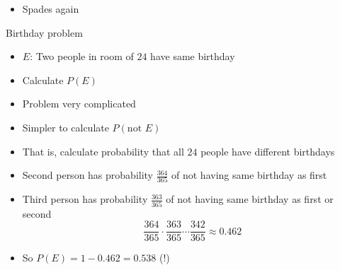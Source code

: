 \documentclass[handout]{beamer}
\theoremstyle{definition}
\begin{document}
\begin{frame}
\begin{itemize}
\item Spades again
\end{itemize}
\end{frame}

\begin{frame}{Birthday problem}
\begin{itemize}
\item $E$: Two people in room of $24$ have same birthday
\item Calculate $P\left(E\right)$
\item Problem very complicated
\item Simpler to calculate $P\left(\text{not $E$}\right)$
\item That is, calculate probability that all $24$ people
have different birthdays
\item Second person has probability $\frac{364}{365}$ of
not having same birthday as first
\item Third person has probability $\frac{363}{365}$ of
not having same birthday as first or second
\[\frac{364}{365}
\cdot\frac{363}{365}
\cdots\frac{342}{365}\approx 0.462\]
\item So $P\left(E\right)=1-0.462=0.538$ (\alert{!})
\end{itemize}

\end{frame}
\end{document}
